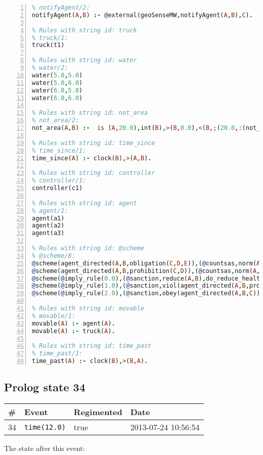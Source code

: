 \documentclass[11pt]{article}\usepackage[utf8]{inputenc}\usepackage{geometry}
\begin{document}
\begin{lstlisting}[language=Prolog, numbers=left]
% Rules with string id: notifyAgent
% notifyAgent/2:
notifyAgent(A,B) :- @external(geoSenseMW,notifyAgent(A,B),C).

% Rules with string id: truck
% truck/1:
truck(t1)

% Rules with string id: water
% water/2:
water(5.0,5.0)
water(5.0,6.0)
water(6.0,5.0)
water(6.0,6.0)

% Rules with string id: not_area
% not_area/2:
not_area(A,B) :-  is (A,20.0),int(B),>(B,0.0),<(B,;(20.0,:(not_area(A,B), is (-(B),20.0)))),int(A),>(A,0.0),<(A,;(20.0,:(area(A,B),-(int(A))))),int(B),>(A,0.0),>(B,0.0),<(A,21.0),<(B,21.0).

% Rules with string id: time_since
% time_since/1:
time_since(A) :- clock(B),>(A,B).

% Rules with string id: controller
% controller/1:
controller(c1)

% Rules with string id: agent
% agent/1:
agent(a1)
agent(a2)
agent(a3)

% Rules with string id: @scheme
% @scheme/8:
@scheme(agent_directed(A,B,obligation(C,D,E)),(@countsas,norm(A,B,F,obligation(C,D,E)),F),false,(listTrue(C)),(time_past(D)),false,[plus(viol(agent_directed(A,B,obligation(C,D,E))))|[]],[plus(obey(agent_directed(A,B,obligation(C,D,E))))|[]])
@scheme(agent_directed(A,B,prohibition(C,D)),(@countsas,norm(A,B,E,prohibition(C,D)),E),(listTrue(C)),false,(false),false,[plus(viol(agent_directed(A,B,prohibition(C,D))))|[]],[plus(obey(agent_directed(A,B,prohibition(C,D))))|[]])
@scheme(@imply_rule(0.0),(@sanction,reduce(A,B),do_reduce_health(A,B),notifyAgent(A,changed(status))),true,false,false,false,[min(reduce(A,B))|[]],[])
@scheme(@imply_rule(1.0),(@sanction,viol(agent_directed(A,B,prohibition(C,D))),do_sanction(D)),true,false,false,false,[min(viol(agent_directed(A,B,prohibition(C,D))))|[]],[])
@scheme(@imply_rule(2.0),(@sanction,obey(agent_directed(A,B,C))),true,false,false,false,[min(obey(agent_directed(A,B,C)))|[]],[])

% Rules with string id: movable
% movable/1:
movable(A) :- agent(A).
movable(A) :- truck(A).

% Rules with string id: time_past
% time_past/1:
time_past(A) :- clock(B),>(B,A).

\end{lstlisting}
\clearpage 
\subsection{Prolog state 34}
\begin{table}[ht]
\centering 
\begin{tabular}{l l l l} 
\textbf{\#} & \textbf{Event} & \textbf{Regimented} & \textbf{Date} \\ [0.5ex] 
\hline
34&\texttt{time(12.0)}&true&2013-07-24 10:56:54\\ [1ex] \hline\end{tabular}
\end{table}
The state after this event:
\end{document}
